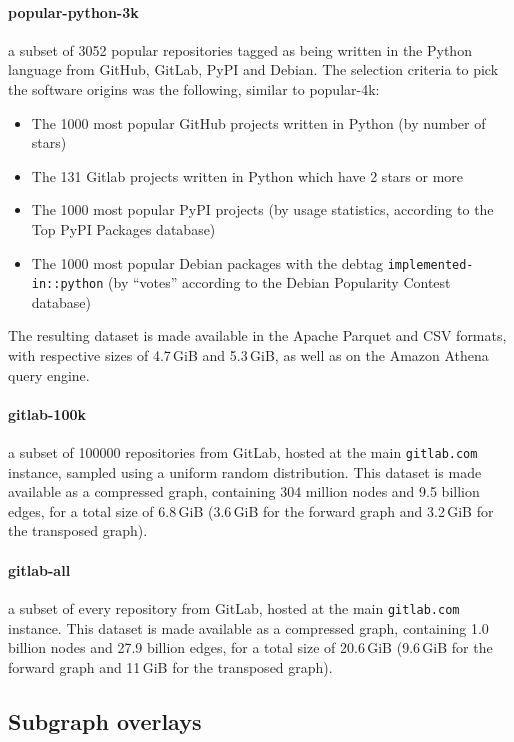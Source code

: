 \paragraph{popular-python-3k} a subset of 3052 popular repositories tagged as
being written in the Python language from GitHub, GitLab, PyPI and Debian. The
selection criteria to pick the software origins was the following, similar to
popular-4k:

\begin{itemize}
    \setlength\itemsep{0em}
    \item The 1000 most popular GitHub projects written in Python (by number of
        stars)
    \item The 131 Gitlab projects written in Python which have 2 stars or more
    \item The 1000 most popular PyPI projects (by usage statistics, according
        to the Top PyPI Packages database)
    \item The 1000 most popular Debian packages with the debtag
        \texttt{implemented-in::python} (by “votes” according to the Debian
        Popularity Contest database)
\end{itemize}

The resulting dataset is made available in the Apache Parquet and CSV formats,
with respective sizes of 4.7\,GiB and 5.3\,GiB, as well as on the Amazon Athena
query engine.

\paragraph{gitlab-100k} a subset of \num{100000} repositories from GitLab,
hosted at the main \texttt{gitlab.com} instance, sampled using a uniform random
distribution. This dataset is made available as a compressed graph, containing
304 million nodes and 9.5 billion edges, for a total size of 6.8\,GiB (3.6\,GiB
for the forward graph and 3.2\,GiB for the transposed graph).

\paragraph{gitlab-all} a subset of every repository from GitLab, hosted at the
main \texttt{gitlab.com} instance. This dataset is made available as a
compressed graph, containing 1.0 billion nodes and 27.9 billion edges, for a
total size of 20.6\,GiB (9.6\,GiB for the forward graph and 11\,GiB for the
transposed graph).

\subsection{Subgraph overlays}

